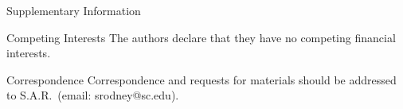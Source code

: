 \documentclass{nature_arxiv}
\begin{document}
\begin{addendum}
 \item[Supplementary Information] 
 \item 
 \item[Competing Interests] The authors declare that they have no
competing financial interests.
 \item[Correspondence] Correspondence and requests for materials
should be addressed to S.A.R.~(email: srodney@sc.edu).
\end{addendum}



\end{document}
